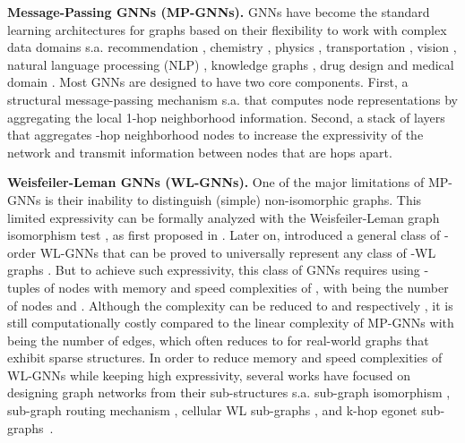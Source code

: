 \documentclass{article}
\begin{document}
{\bf Message-Passing GNNs (MP-GNNs).} GNNs have become the standard learning architectures for graphs based on their  flexibility to work with complex data domains s.a. recommendation \citep{monti2017geometric,van2018graph}, chemistry \citep{duvenaud2015convolutional,gilmer2017neural}, physics \citep{cranmer2019learning, bapst2020unveiling}, transportation \citep{derrowpinion2021traffic}, vision \citep{han2022vision}, natural language processing (NLP) \citep{wu2021graph}, knowledge graphs \citep{schlichtkrull2018modeling}, drug design \citep{stokes2020deep, gaudelet2020utilising} and medical domain \citep{li2020graph,li2021braingnn}. Most GNNs are designed to have two core components. First, a structural message-passing mechanism s.a. \citet{defferrard2016convolutional, kipf2017semi, hamilton2017inductive, monti2017geometric, bresson2017gatedgcn, gilmer2017neural, velivckovic2018graph} that computes node representations by aggregating the local 1-hop neighborhood information. Second, a stack of  layers that aggregates -hop neighborhood nodes to increase the expressivity of the network and transmit information between nodes that are  hops apart. 


{\bf Weisfeiler-Leman GNNs (WL-GNNs).} One of the major limitations of MP-GNNs is their inability to distinguish (simple) non-isomorphic graphs. This limited expressivity can be formally analyzed with the Weisfeiler-Leman graph isomorphism test \citep{weisfeiler1968reduction}, as first proposed in \citet{xu2018how, morris2019weisfeiler}. Later on, \citet{maron2018invariant} introduced a general class of -order WL-GNNs that can be proved to universally represent any class of -WL graphs \citep{maron2019provably, chen2019equivalence}. But to achieve such expressivity, this class of GNNs requires using -tuples of nodes with memory and speed complexities of , with  being the number of nodes and . Although the complexity can be reduced to  and  respectively \citep{maron2019provably,chen2019equivalence,azizian2020expressive}, it is still computationally costly compared to the linear complexity  of MP-GNNs with  being the number of edges, which often reduces to  for real-world graphs that exhibit sparse structures.
In order to reduce memory and speed complexities of WL-GNNs while keeping high expressivity, several works have focused on designing graph networks from their sub-structures s.a. sub-graph isomorphism \citep{bouritsas2022improving}, sub-graph routing mechanism \citep{alsentzer2020subgraph}, cellular WL sub-graphs \citep{bodnar2021weisfeiler}, and k-hop egonet sub-graphs~\citep{xu2018how, zhang2021nested, chen2019equivalence, zhao2021stars, sun}.
\end{document}
